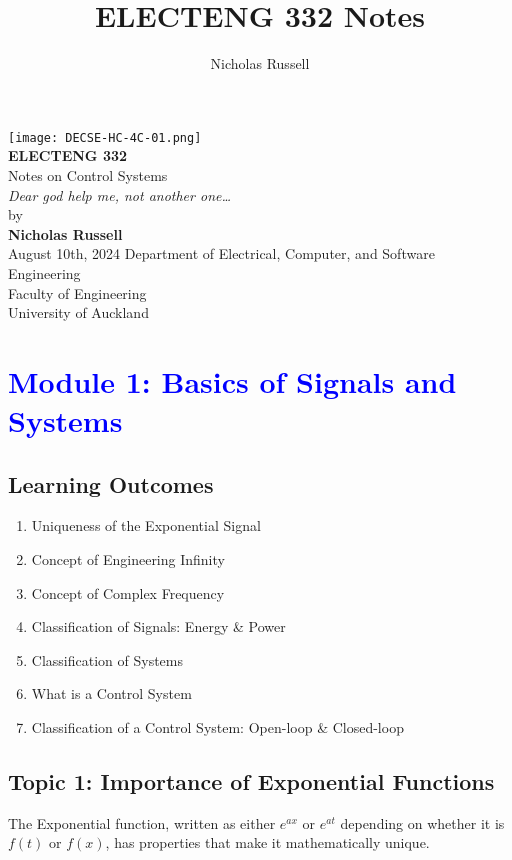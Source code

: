 \documentclass[12pt]{report}
\title{ELECTENG 332 Notes}
\author{Nicholas Russell}
\begin{document}
\begin{titlepage}
    \centering
    \texttt{[image: DECSE-HC-4C-01.png]}\\[1cm] %
    {\LARGE \textbf{ELECTENG 332}}\\[0.5cm]
    {\Large Notes on Control Systems}\\[0.5cm]
    {\textit{Dear god help me, not another one\dots\ }}\\[2cm]
    {\large by}\\[0.3cm]
    {\large \textbf{Nicholas Russell}}\\[1.4cm]
    {\large August 10th, 2024}
    \vfill %
    {\large Department of Electrical, Computer, and Software Engineering}\\[0.3cm]
    {\large Faculty of Engineering}\\[0.3cm]
    {\large University of Auckland}
\end{titlepage}

\tableofcontents
\newpage

\chapter{\textcolor{blue}{Module 1: Basics of Signals and Systems}}

\section*{Learning Outcomes}
\begin{enumerate}[label=\blacktriangleright, leftmargin=*, itemsep=0.5em]
    \item Uniqueness of the Exponential Signal
    \item Concept of Engineering Infinity
    \item Concept of Complex Frequency
    \item Classification of Signals: Energy \& Power
    \item Classification of Systems
    \item What is a Control System
    \item Classification of a Control System: Open-loop \& Closed-loop
\end{enumerate}

\section{Topic 1: Importance of Exponential Functions}
The Exponential function, written as either
\(e^{ax}\) or \(e^{at}\) depending on whether it is \(f(t)\) or \(f(x)\),
has properties that make it mathematically unique.
\end{document}
